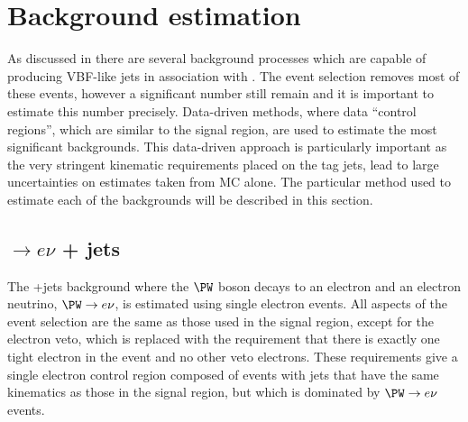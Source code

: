 \section{Background estimation}
\label{sec:promptbkg}
As discussed in  there are several background processes which are capable of producing VBF-like jets in association with \MET. The event selection removes most of these events, however a significant number still remain and it is important to estimate this number precisely. Data-driven methods, where data ``control regions'', which are similar to the signal region, are used to estimate the most significant backgrounds. This data-driven approach is particularly important as the very stringent kinematic requirements placed on the tag jets, lead to large uncertainties on estimates taken from \ac{MC} alone. The particular method used to estimate each of the backgrounds will be described in this section.

\subsection{\PW$\rightarrow e\nu$ + jets}
\label{sec:promptwenu}
The \PW+jets background where the $\PW$ boson decays to an electron and an electron neutrino, $\PW\rightarrow e\nu$, is estimated using single electron events. All aspects of the event selection are the same as those used in the signal region, except for the electron veto, which is replaced with the requirement that there is exactly one tight electron in the event and no other veto electrons. These requirements give a single electron control region composed of events with jets that have the same kinematics as those in the signal region, but which is dominated by $\PW\rightarrow e\nu$ events.

